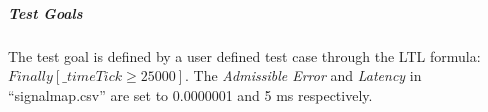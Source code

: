 %
%
%
%
%

\subparagraph{Test Goals}
The test goal is defined by a user defined test case through the LTL formula: $Finally [\_timeTick \ge 25000]$. The \emph{Admissible Error} and \emph{Latency} in ``signalmap.csv'' are set to 0.0000001 and 5 ms respectively.

